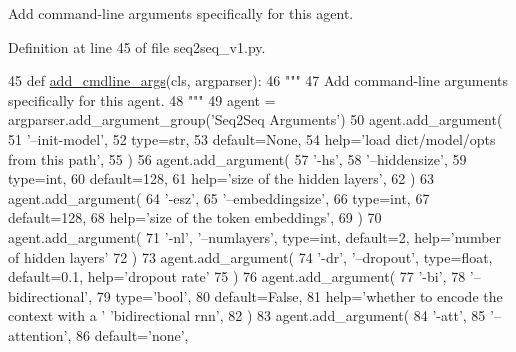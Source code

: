 \begin{DoxyVerb}Add command-line arguments specifically for this agent.
\end{DoxyVerb}
 

Definition at line 45 of file seq2seq\+\_\+v1.\+py.


\begin{DoxyCode}
45     \textcolor{keyword}{def }\hyperlink{namespaceparlai_1_1agents_1_1drqa_1_1config_a62fdd5554f1da6be0cba185271058320}{add\_cmdline\_args}(cls, argparser):
46         \textcolor{stringliteral}{"""}
47 \textcolor{stringliteral}{        Add command-line arguments specifically for this agent.}
48 \textcolor{stringliteral}{        """}
49         agent = argparser.add\_argument\_group(\textcolor{stringliteral}{'Seq2Seq Arguments'})
50         agent.add\_argument(
51             \textcolor{stringliteral}{'--init-model'},
52             type=str,
53             default=\textcolor{keywordtype}{None},
54             help=\textcolor{stringliteral}{'load dict/model/opts from this path'},
55         )
56         agent.add\_argument(
57             \textcolor{stringliteral}{'-hs'},
58             \textcolor{stringliteral}{'--hiddensize'},
59             type=int,
60             default=128,
61             help=\textcolor{stringliteral}{'size of the hidden layers'},
62         )
63         agent.add\_argument(
64             \textcolor{stringliteral}{'-esz'},
65             \textcolor{stringliteral}{'--embeddingsize'},
66             type=int,
67             default=128,
68             help=\textcolor{stringliteral}{'size of the token embeddings'},
69         )
70         agent.add\_argument(
71             \textcolor{stringliteral}{'-nl'}, \textcolor{stringliteral}{'--numlayers'}, type=int, default=2, help=\textcolor{stringliteral}{'number of hidden layers'}
72         )
73         agent.add\_argument(
74             \textcolor{stringliteral}{'-dr'}, \textcolor{stringliteral}{'--dropout'}, type=float, default=0.1, help=\textcolor{stringliteral}{'dropout rate'}
75         )
76         agent.add\_argument(
77             \textcolor{stringliteral}{'-bi'},
78             \textcolor{stringliteral}{'--bidirectional'},
79             type=\textcolor{stringliteral}{'bool'},
80             default=\textcolor{keyword}{False},
81             help=\textcolor{stringliteral}{'whether to encode the context with a '} \textcolor{stringliteral}{'bidirectional rnn'},
82         )
83         agent.add\_argument(
84             \textcolor{stringliteral}{'-att'},
85             \textcolor{stringliteral}{'--attention'},
86             default=\textcolor{stringliteral}{'none'},

\end{DoxyCode}
